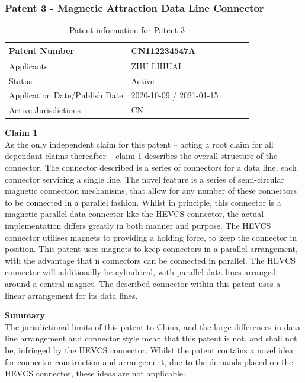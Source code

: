 \documentclass [12pt]{article}
\begin{document}
\subsubsection{Patent 3 - Magnetic Attraction Data Line Connector}
\begin{table}[H]
    \centering
    \setlength{\arrayrulewidth}{1.5pt}
    \begin{tabular}{|p{0.5\linewidth}|p{0.5\linewidth}|}
    \hline
    Patent Number & \href{https://worldwide.espacenet.com/patent/search/family/074120319/publication/CN112234547A?q=CN112234547A}{CN112234547A}\\
    \hline
    Applicants &ZHU LIHUAI\\
    \hline
    Status & Active\\
    \hline
    Application Date/Publish Date & 2020-10-09 / 2021-01-15\\
    \hline
    Active Jurisdictions & CN\\
    \hline
    \end{tabular}
    \caption{Patent information for Patent 3}
    \label{table:mag_con3}
\end{table}
\textbf{Claim 1}\\
As the only independent claim for this patent – acting a root claim for all dependant claims thereafter – claim 1 describes the overall structure of the connector. The connector described is a series of connectors for a data line, each connector servicing a single line. The novel feature is a series of semi-circular magnetic connection mechanisms, that allow for any number of these connectors to be connected in a parallel fashion.
Whilst in principle, this connector is a magnetic parallel data connector like the HEVCS connector, the actual implementation differs greatly in both manner and purpose. The HEVCS connector utilises magnets to providing a holding force, to keep the connector in position. This patent uses magnets to keep connectors in a parallel arrangement, with the advantage that n connectors can be connected in parallel.
The HEVCS connector will additionally be cylindrical, with parallel data lines arranged around a central magnet. The described connector within this patent uses a linear arrangement for its data lines.

\textbf{Summary}\\
The jurisdictional limits of this patent to China, and the large differences in data line arrangement and connector style mean that this patent is not, and shall not be, infringed by the HEVCS connector. Whilst the patent contains a novel idea for connector construction and arrangement, due to the demands placed on the HEVCS connector, these ideas are not applicable.
\end{document}
